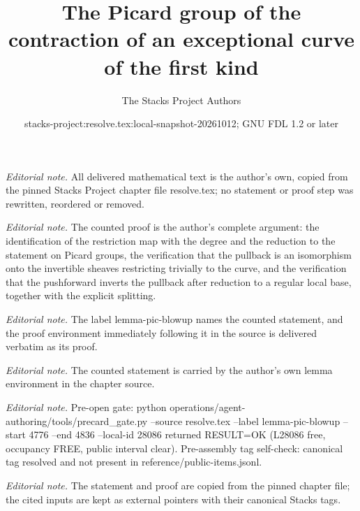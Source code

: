 \documentclass[10pt,a4paper]{amsart}
\title{The Picard group of the contraction of an exceptional curve of the first kind}
\author{The Stacks Project Authors}
\date{stacks-project:resolve.tex:local-snapshot-20261012; GNU FDL 1.2 or later}
\theoremstyle{plain}
\theoremstyle{definition}
\theoremstyle{remark}
\numberwithin{equation}{subsection}
\begin{document}
\maketitle
\noindent\textit{Editorial note.} All delivered mathematical text is the author's own, copied from the pinned Stacks Project chapter file resolve.tex; no statement or proof step was rewritten, reordered or removed.\par\medskip
\noindent\textit{Editorial note.} The counted proof is the author's complete argument: the identification of the restriction map with the degree and the reduction to the statement on Picard groups, the verification that the pullback is an isomorphism onto the invertible sheaves restricting trivially to the curve, and the verification that the pushforward inverts the pullback after reduction to a regular local base, together with the explicit splitting.\par\medskip
\noindent\textit{Editorial note.} The label lemma-pic-blowup names the counted statement, and the proof environment immediately following it in the source is delivered verbatim as its proof.\par\medskip
\noindent\textit{Editorial note.} The counted statement is carried by the author's own lemma environment in the chapter source.\par\medskip
\noindent\textit{Editorial note.} Pre-open gate: python operations/agent-authoring/tools/precard\_gate.py --source resolve.tex --label lemma-pic-blowup --start 4776 --end 4836 --local-id 28086 returned RESULT=OK (L28086 free, occupancy FREE, public interval clear). Pre-assembly tag self-check: canonical tag resolved and not present in reference/public-items.jsonl.\par\medskip
\noindent\textit{Editorial note.} The statement and proof are copied from the pinned chapter file; the cited inputs are kept as external pointers with their canonical Stacks tags.\par\medskip
\end{document}

